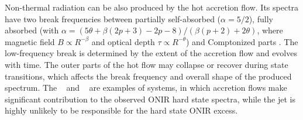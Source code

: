 Non-thermal radiation can be also produced by the hot accretion flow.
Its spectra have two break frequencies between partially self-absorbed ($\alpha = 5/2$), fully absorbed (with $\alpha = (5\theta + \beta(2p + 3) -2p-8)/(\beta(p+2) + 2\theta)$, where magnetic field $B \propto R^{-\beta}$ and optical depth $\tau \propto R^{-\theta}$) and Comptonized parts \citep[see, e.g., ][]{Veledina2013, Poutanen2014a}.
The low-frequency break is determined by the extent of the accretion flow and evolves with time.
The outer parts of the hot flow may collapse or recover during state transitions, which affects the break frequency and overall shape of the produced spectrum.
The \XTEJxv\ \citep{Poutanen2014} and \SwiftJxvii\ \citep{Kajava2016} are examples of systems, in which accretion flows make significant contribution to the observed \gls{ONIR} hard state spectra, while the jet is highly unlikely to be responsible for the hard state \gls{ONIR} excess.


